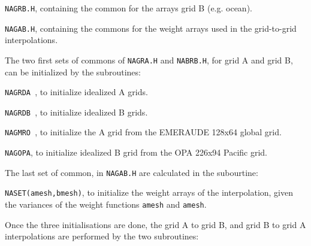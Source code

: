 \medskip

\item{}{\tt NAGRB.H}, containing the common for the arrays grid B (e.g.
ocean). 



\medskip

\item{}{\tt NAGAB.H}, containing the commons for the weight arrays used
in  the grid-to-grid interpolations. 



\medskip
\medskip
{} 
 \medskip

The two first sets of commons of {\tt NAGRA.H} and {\tt NABRB.H}, for grid
A and grid B, can be initialized by the subroutines: 



\medskip

\item{} {\tt NAGRDA },  to initialize idealized  A grids.



\medskip

\item{} {\tt NAGRDB },  to initialize idealized  B grids.



\medskip

\item{} {\tt NAGMRO },  to initialize the A grid from the EMERAUDE
128x64 global grid. 



\medskip

\item{} {\tt NAGOPA},  to initialize idealized  B grid from the OPA
226x94 Pacific grid. 




\medskip
\medskip
{} 
 \medskip

The last set of common, in {\tt NAGAB.H} are calculated in the subourtine: 

\medskip

\item{} {\tt NASET(amesh,bmesh)},
 to initialize the weight arrays of the  interpolation, given the variances
of the weight functions {\tt amesh} and  {\tt amesh}.   


\medskip



Once the three initialisations are done, the grid A to grid B, and  grid  B to
grid A interpolations are  performed by the two subroutines:



